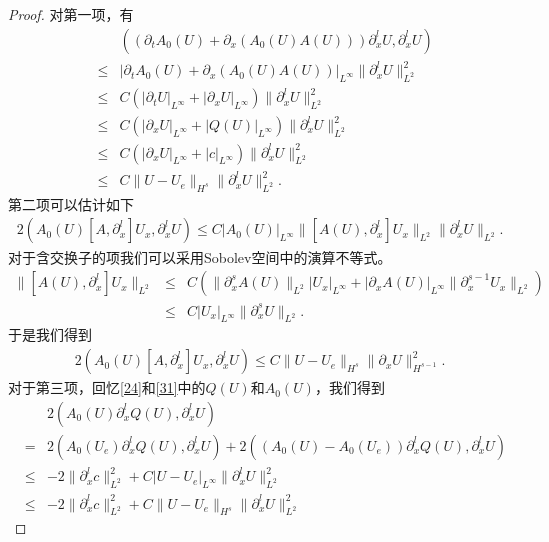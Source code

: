 \begin{proof}
对第一项，有
\begin{eqnarray}\label{HsEST:1}
  && ((\partial_t A_0(U) + \partial_x (A_0(U)A(U)))\partial^l_x U, \partial^l_x U) \nonumber\\
  &\le&|\partial_t A_0(U) + \partial_x (A_0(U)A(U))|_{L^\infty}\|\partial^l_x U\|_{L^2}^2 \nonumber\\
  &\le& C (|\partial_t U|_{L^\infty}+|\partial_x U|_{L^{\infty}})\|\partial^l_x U\|_{L^2}^2  \\
  &\le& C (|\partial_x U|_{L^\infty}+|Q(U)|_{L^\infty})\|\partial^l_x U\|_{L^2}^2\nonumber\\
  &\le& C (|\partial_x U|_{L^\infty} + |c|_{L^\infty}) \|\partial^l_x U\|_{L^2}^2\nonumber \\
  &\le& C \|U-U_e\|_{H^s} \|\partial^l_x U\|_{L^2}^2. \nonumber
\end{eqnarray}
第二项可以估计如下
\begin{eqnarray*}
  2(A_0(U) [A,\partial^l_x] U_x, \partial^l_x U) \le C |A_0(U)|_{L^\infty} \|[A(U),\partial^l_x] U_x\|_{L^2} \|\partial^l_x U\|_{L^2}.
\end{eqnarray*}
对于含交换子的项我们可以采用Sobolev空间中的演算不等式\cite{majda1984compressible}。
\begin{eqnarray*}
  \|[A(U),\partial^l_x] U_x\|_{L^2} &\le& C (\|\partial_x^s A(U)\|_{L^2}|U_x|_{L^\infty} + |\partial_x A(U)|_{L^{\infty}} \|\partial_x^{s-1} U_x\|_{L^2})  \\
  &\le& C|U_x|_{L^\infty} \|\partial_x^s U\|_{L^2}.
\end{eqnarray*}
于是我们得到
\begin{eqnarray}\label{HsEST:2}
  2(A_0(U) [A,\partial_x^l] U_x,\partial^l_x U) \le C \|U-U_e\|_{H^s}\|\partial_x U\|_{H^{s-1}}^2.
\end{eqnarray}
对于第三项，回忆\eqref{24}和\eqref{31}中的$Q(U)$和$A_0(U)$，我们得到
\begin{eqnarray}\label{HsEST:3}
&& 2(A_0(U)\partial^l_x Q(U),\partial^l_x U) \nonumber \\
&=& 2( A_0(U_e)\partial^l_x Q(U),\partial^l_x U) + 2((A_0(U)-A_0(U_e)) \partial^l_x Q(U),\partial^l_x U) \nonumber \\
&\le&  -2 \|\partial^l_x c\|_{L^2}^2 + C|U-U_e|_{L^\infty} \|\partial^l_x U\|_{L^2}^2 \nonumber \\
&\le& -2 \|\partial^l_x c\|_{L^2}^2 + C\|U-U_e\|_{H^s} \|\partial^l_x U\|_{L^2}^2
\end{eqnarray}


\end{proof}

